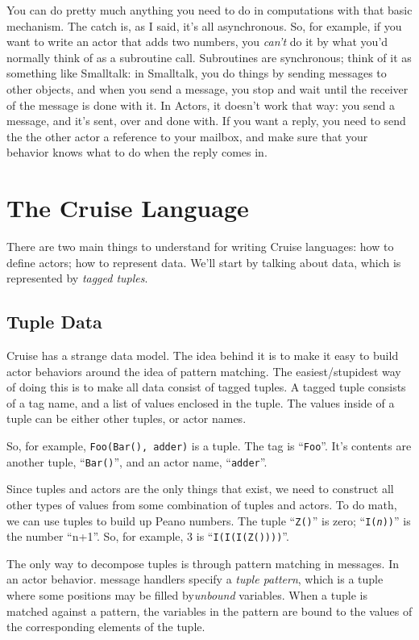 \documentclass[11pt]{article}
\begin{document}
You can do pretty much anything you need to do in computations with that basic mechanism. The catch is, as I said, it's all asynchronous. So, for example, if you want to write an actor that adds two numbers,
you {\em can't} do it by what you'd normally think of as a subroutine call. Subroutines are synchronous; think of it as something like Smalltalk: in Smalltalk, you do things by sending messages to other objects, 
and when you send a message, you stop and wait until the receiver of the message is done with it. In Actors, it doesn't work that way: you send a message, and it's sent, over and done with. If you want a 
reply, you need to send the the other actor a reference to your mailbox, and make sure that your behavior knows what to do when the reply comes in.


\section{The Cruise Language}

There are two main things to understand for writing Cruise languages: how to define actors; how to represent data. We'll start by talking about data, which is represented by {\em tagged tuples}. 

\subsection{Tuple Data}

Cruise has a strange data model. The idea behind it is to make it easy to build actor behaviors around the idea of pattern matching. The easiest/stupidest way of doing this is to make all data consist of tagged tuples. A tagged tuple consists of a tag name, and a list of values enclosed in the tuple. The values inside of a tuple can be either other tuples, or actor names.

So, for example, {\tt Foo(Bar(), adder)} is a tuple. The tag is ``{\tt Foo}''. It's contents are another tuple, ``{\tt Bar()}'', and an actor name, ``{\tt adder}''. 

Since tuples and actors are the only things that exist, we need to construct all other types
of values from some combination of tuples and actors. To do math, we can use tuples to build up Peano numbers. The tuple ``{\tt Z()}'' is zero; ``{\tt I({\em n}))}'' is the number ``n+1''. So, for example, 3 is ``{\tt I(I(I(Z())))}''.

The only way to decompose tuples is through pattern matching in messages. In an actor behavior. message handlers specify a {\em tuple pattern}, which is a tuple where some positions may be filled by{\em unbound} variables. When a tuple is matched against a pattern, the variables in the pattern are bound to the values of the corresponding elements of the tuple.
\end{document}
